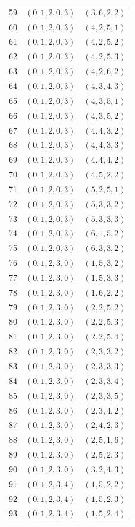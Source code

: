 \documentclass[11pt,a4paper]{article}
\theoremstyle{definition}
\theoremstyle{remark}
\begin{document}
\begin{longtable}{rll}
59 & $(0,1,2,0,3)$ & $(3,6,2,2)$\\
60 & $(0,1,2,0,3)$ & $(4,2,5,1)$\\
61 & $(0,1,2,0,3)$ & $(4,2,5,2)$\\
62 & $(0,1,2,0,3)$ & $(4,2,5,3)$\\
63 & $(0,1,2,0,3)$ & $(4,2,6,2)$\\
64 & $(0,1,2,0,3)$ & $(4,3,4,3)$\\
65 & $(0,1,2,0,3)$ & $(4,3,5,1)$\\
66 & $(0,1,2,0,3)$ & $(4,3,5,2)$\\
67 & $(0,1,2,0,3)$ & $(4,4,3,2)$\\
68 & $(0,1,2,0,3)$ & $(4,4,3,3)$\\
69 & $(0,1,2,0,3)$ & $(4,4,4,2)$\\
70 & $(0,1,2,0,3)$ & $(4,5,2,2)$\\
71 & $(0,1,2,0,3)$ & $(5,2,5,1)$\\
72 & $(0,1,2,0,3)$ & $(5,3,3,2)$\\
73 & $(0,1,2,0,3)$ & $(5,3,3,3)$\\
74 & $(0,1,2,0,3)$ & $(6,1,5,2)$\\
75 & $(0,1,2,0,3)$ & $(6,3,3,2)$\\
76 & $(0,1,2,3,0)$ & $(1,5,3,2)$\\
77 & $(0,1,2,3,0)$ & $(1,5,3,3)$\\
78 & $(0,1,2,3,0)$ & $(1,6,2,2)$\\
79 & $(0,1,2,3,0)$ & $(2,2,5,2)$\\
80 & $(0,1,2,3,0)$ & $(2,2,5,3)$\\
81 & $(0,1,2,3,0)$ & $(2,2,5,4)$\\
82 & $(0,1,2,3,0)$ & $(2,3,3,2)$\\
83 & $(0,1,2,3,0)$ & $(2,3,3,3)$\\
84 & $(0,1,2,3,0)$ & $(2,3,3,4)$\\
85 & $(0,1,2,3,0)$ & $(2,3,3,5)$\\
86 & $(0,1,2,3,0)$ & $(2,3,4,2)$\\
87 & $(0,1,2,3,0)$ & $(2,4,2,3)$\\
88 & $(0,1,2,3,0)$ & $(2,5,1,6)$\\
89 & $(0,1,2,3,0)$ & $(2,5,2,3)$\\
90 & $(0,1,2,3,0)$ & $(3,2,4,3)$\\
91 & $(0,1,2,3,4)$ & $(1,5,2,2)$\\
92 & $(0,1,2,3,4)$ & $(1,5,2,3)$\\
93 & $(0,1,2,3,4)$ & $(1,5,2,4)$\\

\end{longtable}
\end{document}

